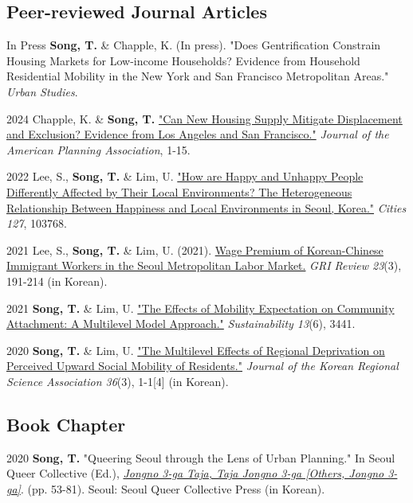 \documentclass[12pt,letterpaper]{report}
\begin{document}
    \subsection*{Peer-reviewed Journal Articles}
    \begin{tablist}
        \item[In Press] \tab{}\textbf{Song, T.} \& Chapple, K. (In press). "Does Gentrification Constrain Housing Markets for Low-income Households? Evidence from Household Residential Mobility in the New York and San Francisco Metropolitan Areas." \emph{Urban Studies}.
        \item[2024] \tab{}Chapple, K. \& \textbf{Song, T.} \href{https://doi.org/10.1080/01944363.2024.2319293}{"Can New Housing Supply Mitigate Displacement and Exclusion? Evidence from Los Angeles and San Francisco."} \emph{Journal of the American Planning Association}, 1-15.
        \item[2022] \tab{}Lee, S., \textbf{Song, T.} \& Lim, U. \href{https://doi.org/10.1016/j.cities.2022.103768}{"How are Happy and Unhappy People Differently Affected by Their Local Environments? The Heterogeneous Relationship Between Happiness and Local Environments in Seoul, Korea."} \emph{Cities 127}, 103768.
        \item[2021] \tab{}Lee, S., \textbf{Song, T.} \& Lim, U. (2021). \href{https://www.dbpia.co.kr/Journal/articleDetail?nodeId=NODE11025769}{Wage Premium of Korean-Chinese Immigrant Workers in the Seoul Metropolitan Labor Market.} \emph{GRI Review 23}(3), 191-214 (in Korean).
        \item[2021] \tab{}\textbf{Song, T.} \& Lim, U. \href{https://www.mdpi.com/2071-1050/13/6/3441}{"The Effects of Mobility Expectation on Community Attachment: A Multilevel Model Approach."} \emph{Sustainability 13}(6), 3441.
        \item[2020] \tab{}\textbf{Song, T.} \& Lim, U. \href{"https://www.koreascience.or.kr/article/JAKO202030161655441.page}{"The Multilevel Effects of Regional Deprivation on Perceived Upward Social Mobility of Residents."} \emph{Journal of the Korean Regional Science Association 36}(3), 1-1[4] (in Korean).
    \end{tablist}
    \subsection*{Book Chapter}
    \begin{tablist}
        \item[2020] \tab{}\textbf{Song, T.} "Queering Seoul through the Lens of Urban Planning." In Seoul Queer Collective (Ed.), \emph{\href{http://www.kyobobook.co.kr/product/detailViewKor.laf?ejkGb=KOR&mallGb=KOR&barcode=9791197096501}{Jongno 3-ga Taja, Taja Jongno 3-ga [Others, Jongno 3-ga]}}. (pp. 53-81). Seoul: Seoul Queer Collective Press (in Korean).
    \end{tablist}
\end{document}
